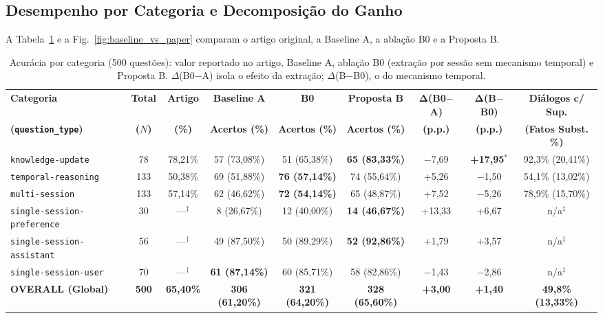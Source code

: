\documentclass[10pt,conference,twocolumn]{IEEEtran}
\begin{document}
\subsection{Desempenho por Categoria e Decomposição do Ganho}
A Tabela~\ref{tab:ab_results} e a Fig.~\ref{fig:baseline_vs_paper} comparam o artigo original, a Baseline A, a ablação B0 e a Proposta B.

\begin{table}[!t]
\caption{Acurácia por categoria (500 questões): valor reportado no artigo, Baseline A, ablação B0 (extração por sessão sem mecanismo temporal) e Proposta B. $\Delta$(B0$-$A) isola o efeito da extração; $\Delta$(B$-$B0), o do mecanismo temporal.}
\label{tab:ab_results}
\centering
\footnotesize
\setlength{\tabcolsep}{5.2pt}
\begin{tabular}{lcccccccc}
\toprule
\textbf{Categoria} & \textbf{Total} & \textbf{Artigo} & \textbf{Baseline A} & \textbf{B0} & \textbf{Proposta B} & $\mathbf{\Delta}$\textbf{(B0$-$A)} & $\mathbf{\Delta}$\textbf{(B$-$B0)} & \textbf{Diálogos c/ Sup.} \\
\textbf{(\texttt{question\_type})} & \textbf{($N$)} & \textbf{(\%)} & \textbf{Acertos (\%)} & \textbf{Acertos (\%)} & \textbf{Acertos (\%)} & \textbf{(p.p.)} & \textbf{(p.p.)} & \textbf{(Fatos Subst. \%)} \\
\midrule
\texttt{knowledge-update} & 78 & 78,21\% & 57 (73,08\%) & 51 (65,38\%) & \textbf{65 (83,33\%)} & $-$7,69 & \textbf{+17,95}$^*$ & 92,3\% (20,41\%) \\
\texttt{temporal-reasoning} & 133 & 50,38\% & 69 (51,88\%) & \textbf{76 (57,14\%)} & 74 (55,64\%) & +5,26 & $-$1,50 & 54,1\% (13,02\%) \\
\texttt{multi-session} & 133 & 57,14\% & 62 (46,62\%) & \textbf{72 (54,14\%)} & 65 (48,87\%) & +7,52 & $-$5,26 & 78,9\% (15,70\%) \\
\texttt{single-session-preference} & 30 & ---$^\dagger$ & 8 (26,67\%) & 12 (40,00\%) & \textbf{14 (46,67\%)} & +13,33 & +6,67 & n/a$^\ddagger$ \\
\texttt{single-session-assistant} & 56 & ---$^\dagger$ & 49 (87,50\%) & 50 (89,29\%) & \textbf{52 (92,86\%)} & +1,79 & +3,57 & n/a$^\ddagger$ \\
\texttt{single-session-user} & 70 & ---$^\dagger$ & \textbf{61 (87,14\%)} & 60 (85,71\%) & 58 (82,86\%) & $-$1,43 & $-$2,86 & n/a$^\ddagger$ \\
\midrule
\textbf{OVERALL (Global)} & \textbf{500} & \textbf{65,40\%} & \textbf{306 (61,20\%)} & \textbf{321 (64,20\%)} & \textbf{328 (65,60\%)} & \textbf{+3,00} & \textbf{+1,40} & \textbf{49,8\% (13,33\%)} \\

\end{tabular}
\end{table}
\end{document}
